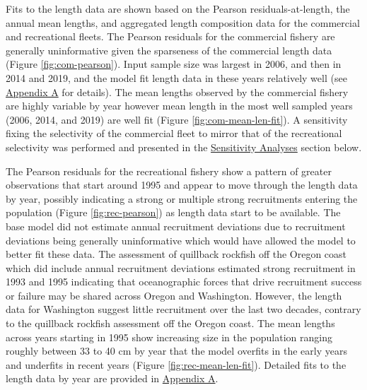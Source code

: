 \documentclass[11pt,
  english,
  a4paper,
]{article}
\begin{document}
Fits to the length data are shown based on the Pearson residuals-at-length, the annual mean lengths, and aggregated length composition data for the commercial and recreational fleets. The Pearson residuals for the commercial fishery are generally uninformative given the sparseness of the commercial length data (Figure \ref{fig:com-pearson}). Input sample size was largest in 2006, and then in 2014 and 2019, and the model fit length data in these years relatively well (see {\protect\hyperlink{append_a}{Appendix A}\leavevmode\tagmcend\tagstructend} for details). The mean lengths observed by the commercial fishery are highly variable by year however mean length in the most well sampled years (2006, 2014, and 2019) are well fit (Figure \ref{fig:com-mean-len-fit}). A sensitivity fixing the selectivity of the commercial fleet to mirror that of the recreational selectivity was performed and presented in the {\protect\hyperlink{sensitivity-analyses}{Sensitivity Analyses}\leavevmode\tagmcend\tagstructend} section below.

\leavevmode\tagmcend\tagstructend\par


The Pearson residuals for the recreational fishery show a pattern of greater observations that start around 1995 and appear to move through the length data by year, possibly indicating a strong or multiple strong recruitments entering the population (Figure \ref{fig:rec-pearson}) as length data start to be available. The base model did not estimate annual recruitment deviations due to recruitment deviations being generally uninformative which would have allowed the model to better fit these data. The assessment of quillback rockfish off the Oregon coast which did include annual recruitment deviations estimated strong recruitment in 1993 and 1995 indicating that oceanographic forces that drive recruitment success or failure may be shared across Oregon and Washington. However, the length data for Washington suggest little recruitment over the last two decades, contrary to the quillback rockfish assessment off the Oregon coast. The mean lengths across years starting in 1995 show increasing size in the population ranging roughly between 33 to 40 cm by year that the model overfits in the early years and underfits in recent years (Figure \ref{fig:rec-mean-len-fit}). Detailed fits to the length data by year are provided in {\protect\hyperlink{append_a}{Appendix A}\leavevmode\tagmcend\tagstructend}.
\end{document}
